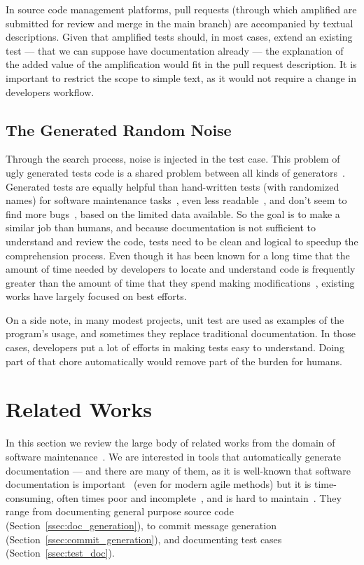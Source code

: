\documentclass[a4paper,11pt]{sdm_internship}
\theoremstyle{definition}
\begin{document}
In source code management platforms, pull requests (through which amplified are submitted for review and merge in the main branch) are accompanied by textual descriptions.
Given that amplified tests should, in most cases, extend an existing test --- that we can suppose have documentation already --- the explanation of the added value of the amplification would fit in the pull request description.
It is important to restrict the scope to simple text, as it would not require a change in developers workflow.

\subsection{The Generated Random Noise}%
\label{ssec:random_noise}
Through the search process, noise is injected in the test case.
This problem of ugly generated tests code is a shared problem between all kinds of generators~\cite{rojas2017search}.
Generated tests are equally helpful than hand-written tests (with randomized names) for software maintenance tasks~\cite{shamshiri2018how}, even less readable~\cite{grano2018empirical}, and don't seem to find more bugs~\cite{fraser2015does}, based on the limited data available.
So the goal is to make a similar job than humans, and because documentation is not sufficient to understand and review the code, tests need to be clean and logical to speedup the comprehension process.
Even though it has been known for a long time that the amount of time needed by developers to locate and understand code is frequently greater than the amount of time that they spend making modifications~\cite{ko2006exploratory}, existing works have largely focused on best efforts.

On a side note, in many modest projects, unit test are used as examples of the program's usage, and sometimes they replace traditional documentation.
In those cases, developers put a lot of efforts in making tests easy to understand.
Doing part of that chore automatically would remove part of the burden for humans.


\section{Related Works}%
\label{sec:related_works}
In this section we review the large body of related works from the domain of software maintenance~\cite{swanson1976dimensions}.
We are interested in tools that automatically generate documentation --- and there are many of them, as it is well-known that software documentation is important~\cite{de2005study} (even for modern agile methods) but it is time-consuming, often times poor and incomplete~\cite{briand2003software}, and is hard to maintain~\cite{forward2002relevance}.
They range from documenting general purpose source code (Section~\ref{ssec:doc_generation}), to commit message generation (Section~\ref{ssec:commit_generation}), and documenting test cases (Section~\ref{ssec:test_doc}).
\end{document}
